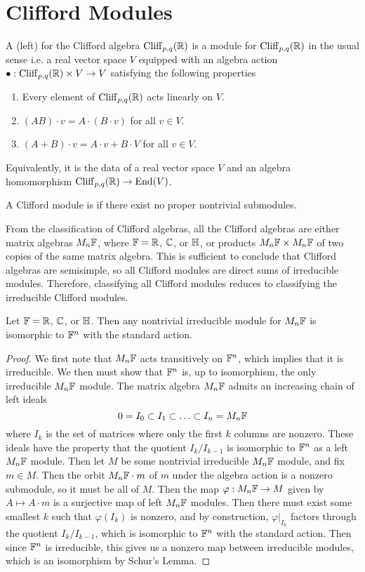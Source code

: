 %
\section{Clifford Modules}
%
\begin{defn}
A (left)  for the Clifford algebra $\operatorname{Cliff}_{p,q}(\mathbb{R})$ is a module
for $\operatorname{Cliff}_{p,q}(\mathbb{R})$ in the usual sense i.e. a real vector space $V$ equipped
with an algebra action $\bullet: \operatorname{Cliff}_{p,q}(\mathbb{R}) \times V \to V$ satisfying
the following properties
\begin{enumerate}
  \item Every element of $\operatorname{Cliff}_{p,q}(\mathbb{R})$ acts linearly on $V$.
  \item $(AB) \cdot v = A\cdot(B \cdot v)$ for all $v \in V$.
  \item $(A + B) \cdot v = A\cdot v + B\cdot V$ for all $v \in V$.
\end{enumerate}
Equivalently, it is the data of a real vector space $V$ and an algebra homomorphism
$\operatorname{Cliff}_{p,q}(\mathbb{R}) \to \operatorname{End}(V)$.
\end{defn}
%
\begin{defn}
A Clifford module is  if there exist no proper nontrivial submodules.
\end{defn}
%
From the classification of Clifford algebras, all the Clifford algebras are either
matrix algebras $M_n\mathbb{F}$, where $\mathbb{F} = \mathbb{R}$, $\mathbb{C}$, or $\mathbb{H}$, or products
$M_n\mathbb{F} \times M_n\mathbb{F}$ of two copies of the same matrix algebra. This is sufficient
to conclude that Clifford algebras are semisimple, so all Clifford modules
are direct sums of irreducible modules. Therefore, classifying all Clifford
modules reduces to classifying the irreducible Clifford modules.
%
\begin{thm}
Let $\mathbb{F} = \mathbb{R}$, $\mathbb{C}$, or $\mathbb{H}$. Then any nontrivial irreducible module for
$M_n\mathbb{F}$ is isomorphic to $\mathbb{F}^n$ with the standard action.
\end{thm}
%
\begin{proof}
We first note that $M_n\mathbb{F}$ acts transitively on $\mathbb{F}^n$, which implies that
it is irreducible. We then must show that $\mathbb{F}^n$ is, up to isomorphism, the only
irreducible $M_n\mathbb{F}$ module. The matrix algebra $M_n\mathbb{F}$ admits an increasing
chain of left ideals
\[
0 = I_0 \subset I_1 \subset \ldots \subset I_n = M_n\mathbb{F}
\]
where $I_k$ is the set of matrices where only the first $k$ columns are nonzero.
These ideals have the property that the quotient $I_k / I_{k-1}$ is isomorphic
to $\mathbb{F}^n$ as a left $M_n\mathbb{F}$ module. Then let $M$ be some nontrivial irreducible
$M_n\mathbb{F}$ module, and fix $m \in M$. Then the orbit $M_n\mathbb{F} \cdot m$ of $m$
under the algebra action is a nonzero submodule, so it must be all of $M$.
Then the map $\varphi : M_n\mathbb{F} \to M$ given by $A \mapsto A \cdot m$ is
a surjective map of left $M_n\mathbb{F}$ modules. Then there must exist some smallest
$k$ such that $\varphi(I_k)$ is nonzero, and by construction,
$\varphi\vert_{I_k}$ factors through the quotient $I_k / I_{k-1}$, which
is isomorphic to $\mathbb{F}^n$ with the standard action. Then since $\mathbb{F}^n$ is irreducible,
this gives us a nonzero map between irreducible modules, which is an isomorphism
by Schur's Lemma.
\end{proof}
